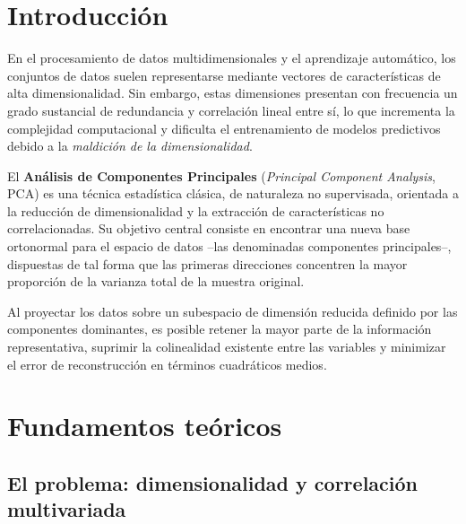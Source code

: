 \documentclass[11pt,letterpaper]{article}
\begin{document}
	
	\setcounter{page}{2}
		
	\tableofcontents
	\thispagestyle{plain}
	\newpage
	
	\section{Introducción}
	
	En el procesamiento de datos multidimensionales y el aprendizaje automático, los conjuntos de datos suelen representarse mediante vectores de características de alta dimensionalidad. Sin embargo, estas dimensiones presentan con frecuencia un grado sustancial de redundancia y correlación lineal entre sí, lo que incrementa la complejidad computacional y dificulta el entrenamiento de modelos predictivos debido a la \emph{maldición de la dimensionalidad}.
	
	El \textbf{Análisis de Componentes Principales} (\emph{Principal Component Analysis}, PCA) es una técnica estadística clásica, de naturaleza no supervisada, orientada a la reducción de dimensionalidad y la extracción de características no correlacionadas. Su objetivo central consiste en encontrar una nueva base ortonormal para el espacio de datos --las denominadas componentes principales--, dispuestas de tal forma que las primeras direcciones concentren la mayor proporción de la varianza total de la muestra original.
	
	Al proyectar los datos sobre un subespacio de dimensión reducida definido por las componentes dominantes, es posible retener la mayor parte de la información representativa, suprimir la colinealidad existente entre las variables y minimizar el error de reconstrucción en términos cuadráticos medios.
	
	\newpage
	
	\section{Fundamentos teóricos}
	
	\subsection{El problema: dimensionalidad y correlación multivariada}
	
\end{document}
